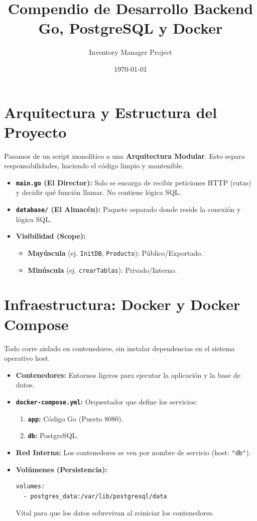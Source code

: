 \documentclass[a4paper,12pt]{article}
\title{\textbf{Compendio de Desarrollo Backend}\\ \large Go, PostgreSQL y Docker}
\author{Inventory Manager Project}
\date{\today}
\begin{document}
\maketitle
\tableofcontents
\newpage

\section{Arquitectura y Estructura del Proyecto}

Pasamos de un script monolítico a una \textbf{Arquitectura Modular}. Esto separa responsabilidades, haciendo el código limpio y mantenible.

\begin{itemize}
    \item \textbf{\texttt{main.go} (El Director):} Solo se encarga de recibir peticiones HTTP (rutas) y decidir qué función llamar. No contiene lógica SQL.
    \item \textbf{\texttt{database/} (El Almacén):} Paquete separado donde reside la conexión y lógica SQL.
    \item \textbf{Visibilidad (Scope):}
    \begin{itemize}
        \item \textbf{Mayúscula} (ej. \texttt{InitDB}, \texttt{Producto}): Público/Exportado.
        \item \textbf{Minúscula} (ej. \texttt{crearTablas}): Privado/Interno.
    \end{itemize}
\end{itemize}

\section{Infraestructura: Docker y Docker Compose}

Todo corre aislado en contenedores, sin instalar dependencias en el sistema operativo host.

\begin{itemize}
    \item \textbf{Contenedores:} Entornos ligeros para ejecutar la aplicación y la base de datos.
    \item \textbf{\texttt{docker-compose.yml}:} Orquestador que define los servicios:
    \begin{enumerate}
        \item \textbf{\texttt{app}:} Código Go (Puerto 8080).
        \item \textbf{\texttt{db}:} PostgreSQL.
    \end{enumerate}
    \item \textbf{Red Interna:} Los contenedores se ven por nombre de servicio (host: \texttt{"db"}).
    \item \textbf{Volúmenes (Persistencia):}
    \begin{verbatim}
volumes:
  - postgres_data:/var/lib/postgresql/data
    \end{verbatim}
    Vital para que los datos sobrevivan al reiniciar los contenedores.
\end{itemize}
\end{document}
